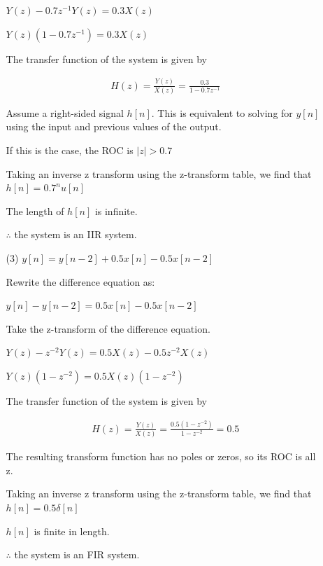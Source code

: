 \documentclass[fleqn]{article}
\begin{document}
\begin{enumerate}[nolistsep]
\begin{enumerate}[nolistsep]
				$Y(z) - 0.7z^{-1}Y(z) = 0.3X(z)$
				
				$Y(z)(1 - 0.7z^{-1}) = 0.3X(z)$
				
				The transfer function of the system is given by
				
				\begin{align*}
					H(z) = \frac{Y(z)}{X(z)} = \frac{0.3}{1 - 0.7z^{-1}}
				\end{align*}
				
				Assume a right-sided signal $h[n]$. This is equivalent to solving for $y[n]$ using the input and previous values of the output.
				
				If this is the case, the ROC is $|z| > 0.7$
				
				Taking an inverse z transform using the z-transform table, we find that $h[n] = 0.7^{n}u[n]$
				
				The length of $h[n]$ is infinite.
				
				$\therefore$ the system is an IIR system.
				
				\item[(3)] $y[n] = y[n-2] + 0.5x[n] - 0.5x[n-2]$
				
				Rewrite the difference equation as:
				
				$y[n] - y[n-2] = 0.5x[n] - 0.5x[n-2]$
				
				Take the z-transform of the difference equation.
				
				$Y(z) - z^{-2}Y(z) = 0.5X(z) - 0.5z^{-2}X(z)$
				
				$Y(z)(1 - z^{-2}) = 0.5X(z)(1 - z^{-2})$
				
				The transfer function of the system is given by
				
				\begin{align*}
					H(z) = \frac{Y(z)}{X(z)} = \frac{0.5(1 - z^{-2})}{1 - z^{-2}} = 0.5
				\end{align*}
				
				The resulting transform function has no poles or zeros, so its ROC is all z.
				
				Taking an inverse z transform using the z-transform table, we find that $h[n] = 0.5\delta[n]$
				
				$h[n]$ is finite in length.
				
				$\therefore$ the system is an FIR system.				
			\end{enumerate}
			
	\end{enumerate}
	
\end{document}
